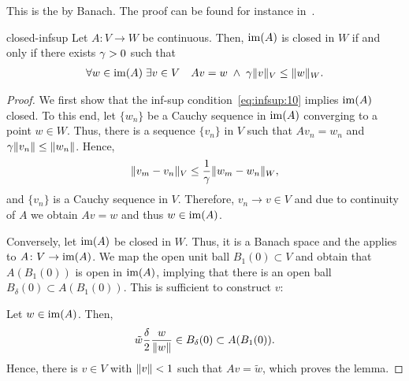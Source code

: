 \begin{remark}
  This is the \emph{} by Banach. The
  proof can be found for instance in~\cite[p.75--76]{Yosida80}.
\end{remark}

\begin{Lemma}{closed-infsup}
  Let $A\colon V\to W$ be continuous. Then, $\operatorname{im}(A)$ is closed in
  $W$ if and only if there exists $\gamma>0$ such that
  \begin{gather}
    \label{eq:infsup:10}
    \forall w\in \operatorname{im}(A)\;
    \exists v\in V\quad
    Av = w
    \;\wedge\;
    \gamma \lVert v\rVert_V \le \lVert w\rVert_W.
  \end{gather}
\end{Lemma}

\begin{proof}
  We first show that the inf-sup condition~\eqref{eq:infsup:10}
  implies $\operatorname{im}(A)$ closed. To this end, let $\{w_n\}$ be a Cauchy
  sequence in $\operatorname{im}(A)$ converging to a point $w\in W$. Thus, there
  is a sequence $\{v_n\}$ in $V$ such that $Av_n = w_n$ and
  $\gamma \lVert v_n\rVert \le \lVert w_n\rVert$. Hence,
  \begin{gather}
    \lVert v_m-v_n\rVert_V \le \frac1{\gamma} \lVert w_m-w_n\rVert_W,
  \end{gather}
  and $\{v_n\}$ is a Cauchy sequence in $V$. Therefore, $v_n\to v\in
  V$ and due to continuity of $A$ we obtain $Av=w$ and thus $w\in
  \operatorname{im}(A)$.

  Conversely, let $\operatorname{im}(A)$ be closed in $W$. Thus, it is a Banach
  space and the  applies to $A\colon
  V\to\operatorname{im}(A)$. We map the open unit ball $B_1(0)\subset V$ and
  obtain that $A(B_1(0))$ is open in $\operatorname{im}(A)$, implying that there
  is an open ball $B_\delta(0) \subset A(B_1(0))$. This is sufficient
  to construct $v$:

  Let $w\in\operatorname{im}(A)$. Then,
  \begin{gather}
    \tilde w\frac\delta2 \frac{w}{\lVert w\rVert} \in B_\delta(0) \subset A(B_1(0)).
  \end{gather}
  Hence, there is $v\in V$ with $\lVert v\rVert<1$ such that $Av=\tilde w$,
  which proves the lemma.
\end{proof}

